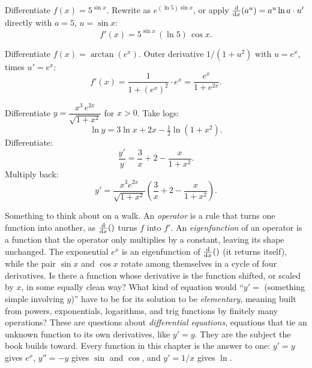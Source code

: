 \begin{example}
\label{ch12:ex-base-change}
Differentiate $f(x) = 5^{\sin x}$. Rewrite as $e^{(\ln 5)\sin x}$, or
apply $\frac{\mathrm{d}}{\mathrm{d} x}\!\left(a^u\right) = a^u\ln a\cdot u'$ directly with $a=5$, $u=\sin x$:
\[
   f'(x) = 5^{\sin x}\,(\ln 5)\,\cos x.
\]
\end{example}

\begin{example}
\label{ch12:ex-arctan-chain}
Differentiate $f(x) = \arctan(e^x)$. Outer derivative $1/(1+u^2)$ with
$u=e^x$, times $u' = e^x$:
\[
   f'(x) = \frac{1}{1+(e^x)^2}\cdot e^x = \frac{e^x}{1+e^{2x}}.
\]
\end{example}

\begin{example}
\label{ch12:ex-logdiff-2}
Differentiate $y = \dfrac{x^{3}\,e^{2x}}{\sqrt{1+x^2}}$ for $x>0$. Take logs:
\[
   \ln y = 3\ln x + 2x - \tfrac12\ln(1+x^2).
\]
Differentiate:
\[
   \frac{y'}{y} = \frac{3}{x} + 2 - \frac{x}{1+x^2}.
\]
Multiply back:
\[
   y' = \frac{x^{3}e^{2x}}{\sqrt{1+x^2}}
        \left(\frac{3}{x} + 2 - \frac{x}{1+x^2}\right).
\]
\end{example}

\begin{walkbox}
Something to think about on a walk. An \emph{operator} is a rule that turns
one function into another, as $\frac{\mathrm{d}}{\mathrm{d} x}\!\left(\right)$ turns $f$ into $f'$. An
\emph{eigenfunction} of an operator is a function that the operator only
multiplies by a constant, leaving its shape unchanged. The exponential $e^x$
is an eigenfunction of $\frac{\mathrm{d}}{\mathrm{d} x}\!\left(\right)$ (it returns itself), while the pair $\sin x$
and $\cos x$ rotate among themselves in a cycle of four derivatives. Is there
a function whose derivative is the function shifted, or scaled by $x$, in some
equally clean way? What kind of equation would ``$y' = $ (something simple
involving $y$)'' have to be for its solution to be \emph{elementary}, meaning
built from powers, exponentials, logarithms, and trig functions by finitely
many operations? These are questions about \emph{differential
equations}, equations that tie an unknown function to its own derivatives,
like $y'=y$. They are the subject the book builds toward. Every function in this
chapter is the answer to one: $y'=y$ gives $e^x$, $y''=-y$ gives $\sin$ and
$\cos$, and $y'=1/x$ gives $\ln$.
\end{walkbox}

